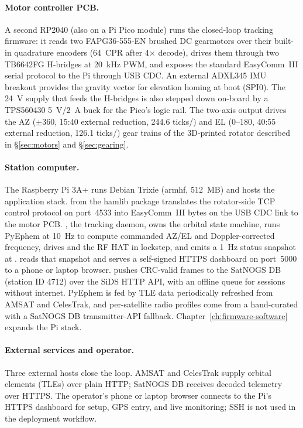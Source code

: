 \paragraph{Motor controller PCB.}
A second RP2040 (also on a Pi Pico module) runs the closed-loop tracking firmware: it reads two FAPG36-555-EN brushed DC gearmotors over their built-in quadrature encoders (64~CPR after 4$\times$ decode), drives them through two TB6642FG H-bridges at 20~kHz PWM, and exposes the standard EasyComm~III serial protocol to the Pi through USB CDC. An external ADXL345 IMU breakout provides the gravity vector for elevation homing at boot (SPI0). The 24~V supply that feeds the H-bridges is also stepped down on-board by a TPS560430 5~V/2~A buck for the Pico's logic rail. The two-axis output drives the AZ ($\pm$360\degree, 15:40 external reduction, 244.6 ticks/\degree) and EL (0--180\degree, 40:55 external reduction, 126.1 ticks/\degree) gear trains of the 3D-printed rotator described in \S\ref{sec:motors} and \S\ref{sec:gearing}.

\paragraph{Station computer.}
The Raspberry Pi 3A+ runs Debian Trixie (armhf, 512~MB) and hosts the application stack.  from the hamlib package translates the rotator-side TCP control protocol on port~4533 into EasyComm~III bytes on the USB CDC link to the motor PCB. , the tracking daemon, owns the orbital state machine, runs PyEphem at 10~Hz to compute commanded AZ/EL and Doppler-corrected frequency, drives  and the RF HAT in lockstep, and emits a 1~Hz status snapshot at .  reads that snapshot and serves a self-signed HTTPS dashboard on port~5000 to a phone or laptop browser.  pushes CRC-valid frames to the SatNOGS DB (station ID 4712) over the SiDS HTTP API, with an offline queue for sessions without internet. PyEphem is fed by TLE data periodically refreshed from AMSAT and CelesTrak, and per-satellite radio profiles come from a hand-curated  with a SatNOGS DB transmitter-API fallback. Chapter~\ref{ch:firmware-software} expands the Pi stack.

\paragraph{External services and operator.}
Three external hosts close the loop. AMSAT and CelesTrak supply orbital elements (TLEs) over plain HTTP; SatNOGS DB receives decoded telemetry over HTTPS. The operator's phone or laptop browser connects to the Pi's HTTPS dashboard for setup, GPS entry, and live monitoring; SSH is not used in the deployment workflow.

